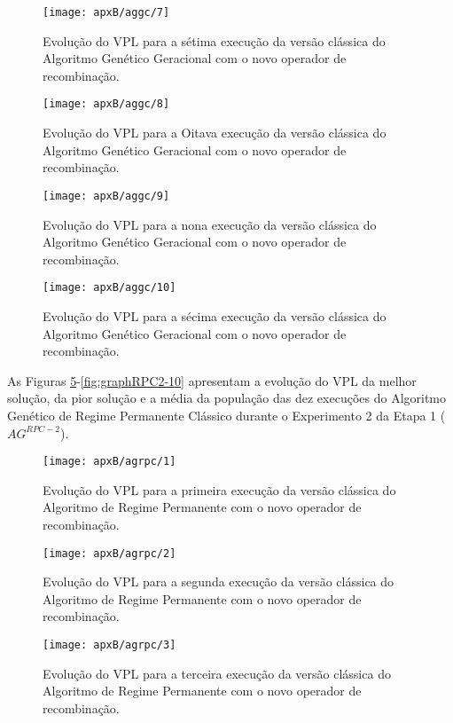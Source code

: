 \begin{figure}[H]
\centering
\texttt{[image: apxB/aggc/7]}
\caption{Evolução do VPL para a sétima execução da versão clássica do Algoritmo Genético Geracional com o novo operador de recombinação.}
\label{fig:graphGC2-07}
\end{figure}

\begin{figure}[H]
\centering
\texttt{[image: apxB/aggc/8]}
\caption{Evolução do VPL para a Oitava execução da versão clássica do Algoritmo Genético Geracional com o novo operador de recombinação.}
\label{fig:graphGC2-08}
\end{figure}

\begin{figure}[H]
\centering
\texttt{[image: apxB/aggc/9]}
\caption{Evolução do VPL para a nona execução da versão clássica do Algoritmo Genético Geracional com o novo operador de recombinação.}
\label{fig:graphGC2-09}
\end{figure}

\begin{figure}[H]
\centering
\texttt{[image: apxB/aggc/10]}
\caption{Evolução do VPL para a sécima execução da versão clássica do Algoritmo Genético Geracional com o novo operador de recombinação.}
\label{fig:graphGC2-10}
\end{figure}

As Figuras \ref{fig:graphRPC2-01}-\ref{fig:graphRPC2-10} apresentam a evolução do VPL da melhor solução, da pior solução e a média da população das dez execuções do Algoritmo Genético de Regime Permanente Clássico durante o Experimento 2 da Etapa 1 ($AG^{RPC-2}$).

\begin{figure}[H]
\centering
\texttt{[image: apxB/agrpc/1]}
\caption{Evolução do VPL para a primeira execução da versão clássica do Algoritmo de Regime Permanente com o novo operador de recombinação.}
\label{fig:graphRPC2-01}
\end{figure}

\begin{figure}[H]
\centering
\texttt{[image: apxB/agrpc/2]}
\caption{Evolução do VPL para a segunda execução da versão clássica do Algoritmo de Regime Permanente com o novo operador de recombinação.}
\label{fig:graphRPC2-02}
\end{figure}

\begin{figure}[H]
\centering
\texttt{[image: apxB/agrpc/3]}
\caption{Evolução do VPL para a terceira execução da versão clássica do Algoritmo de Regime Permanente com o novo operador de recombinação.}
\label{fig:graphRPC2-03}
\end{figure}

